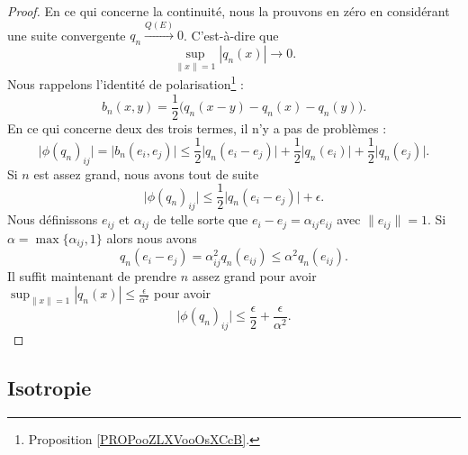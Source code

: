 \begin{proof}
	En ce qui concerne la continuité, nous la prouvons en zéro en considérant une suite convergente \( q_n\stackrel{Q(E)}{\longrightarrow}0\). C'est-à-dire que
	\begin{equation}
		\sup_{\| x \|=1}| q_n(x) |\to 0.
	\end{equation}
	Nous rappelons l'identité de polarisation\footnote{Proposition \ref{PROPooZLXVooOsXCcB}.} :
	\begin{equation}
		b_n(x,y)=\frac{ 1 }{2}\big( q_n(x-y)-q_n(x)-q_n(y) \big).
	\end{equation}
	En ce qui concerne deux des trois termes, il n'y a pas de problèmes :
	\begin{equation}
		\big| \phi(q_n)_{ij} \big|=\big| b_n(e_i,e_j) \big|\leq\frac{ 1 }{2}\big| q_n(e_i-e_j) \big|+\frac{ 1 }{2}\big| q_n(e_i) \big|+\frac{ 1 }{2}\big| q_n(e_j) \big|.
	\end{equation}
	Si \( n\) est assez grand, nous avons tout de suite
	\begin{equation}
		\big| \phi(q_n)_{ij} \big|\leq \frac{ 1 }{2}\big| q_n(e_i-e_j) \big|+\epsilon.
	\end{equation}
	Nous définissons \( e_{ij}\) et \( \alpha_{ij}\) de telle sorte que \( e_i-e_j=\alpha_{ij}e_{ij}\) avec \( \| e_{ij} \|=1\). Si \( \alpha=\max\{ \alpha_{ij},1 \}\) alors nous avons
	\begin{equation}
		q_n(e_i-e_j)=\alpha_{ij}^2q_n(e_{ij})\leq \alpha^2q_n(e_{ij}).
	\end{equation}
	Il suffit maintenant de prendre \( n\) assez grand pour avoir \( \sup_{\| x \|=1}| q_n(x) |\leq \frac{ \epsilon }{ \alpha^2 }\) pour avoir
	\begin{equation}
		\big| \phi(q_n)_{ij} \big|\leq \frac{ \epsilon }{2}+\frac{ \epsilon }{ \alpha^2 }.
	\end{equation}
\end{proof}


\subsection{Isotropie}


